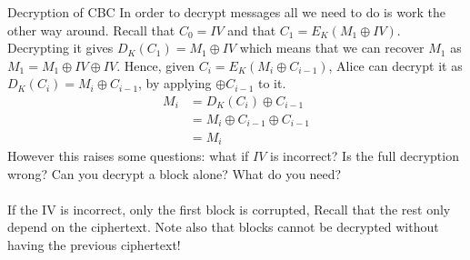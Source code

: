 \begin{parag}{Decryption of CBC}
    In order to decrypt messages all we need to do is work the other way around. Recall that $C_0 =  IV$ and that $C_1 = E_K\left(M_1 \oplus IV\right)$. Decrypting it gives $D_K\left(C_1\right) = M_1 \oplus IV$ which means that we can recover $M_1$ as $M_1 =  M_1 \oplus IV \oplus IV$. Hence, given $C_i =  E_K\left(M_i \oplus C_{i-1}\right)$, Alice can decrypt it as $D_K\left(C_i\right) = M_i \oplus C_{i-1}$, by applying $\oplus C_{i-1}$ to it.
	\begin{align*} 
		M_i &= D_K\left(C_i\right) \oplus C_{i-1} \\
		&= M_i \oplus C_{i-1} \oplus C_{i-1}\\
		&= M_i
	\end{align*}
	However this raises some questions: what if $IV$ is incorrect? Is the full decryption wrong? Can you decrypt a block alone? What do you need?\\
	$ $\\
	If the IV is incorrect, only the first block is corrupted, Recall that the rest only depend on the ciphertext. Note also that blocks cannot be decrypted without having the previous ciphertext!
\end{parag}


